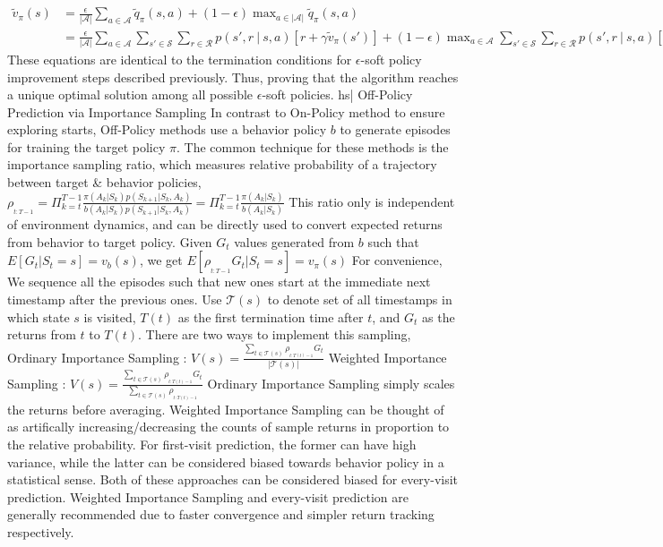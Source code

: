 \( \begin{aligned} \tilde{v}_\pi(s) &= \frac{\epsilon}{|\mathcal{A}|} \sum_{a \in \mathcal{A}} \tilde{q}_\pi(s, a) + (1 - \epsilon) \max_{a \in |\mathcal{A}|} \tilde{q}_\pi(s, a) \\ &= \frac{\epsilon}{|\mathcal{A}|} \sum_{a \in \mathcal{A}} \sum_{ s' \in \mathcal{S}} \sum_{r \in {\mathcal{R}}} p(s', r \ | \ s, a) [r + \gamma \tilde{v}_\pi(s')] + (1 - \epsilon) \max_{a \in \mathcal{A}} \sum_{s' \in \mathcal{S}} \sum_{r \in \mathcal{R}} p(s', r \ | \ s, a) [r + \gamma\tilde{v}_\pi(s')] \end{aligned} \)
These equations are identical to the termination conditions for \( \epsilon \)-soft policy improvement steps described previously. Thus, proving that the algorithm reaches a unique optimal solution among all possible \( \epsilon \)-soft policies.
hs| Off-Policy Prediction via Importance Sampling
In contrast to On-Policy method to ensure exploring starts, Off-Policy methods use a behavior policy \( b \) to generate episodes for training the target policy \( \pi \). The common technique for these methods is the importance sampling ratio, which measures relative probability of a trajectory between target & behavior policies,
\( \rho_{_{t:T-1}} = \Pi_{k=t}^{T-1}\frac{\pi(A_k | S_k) p(S_{k+1} | S_k, A_k)}{b(A_k | S_k) p(S_{k+1} | S_k, A_k)} = \Pi_{k=t}^{T-1} \frac{\pi(A_k | S_k)}{b(A_k | S_k)} \)
This ratio only is independent of environment dynamics, and can be directly used to convert expected returns from behavior to target policy.
Given \( G_t  \) values generated from \( b \) such that \( E[G_t| S_t=s] = v_b(s) \), we get \( E[\rho_{_{t:T-1}} G_t | S_t = s] = v_\pi(s) \)
For convenience, We sequence all the episodes such that new ones start at the immediate next timestamp after the previous ones. Use \( \mathcal{T}(s) \) to denote set of all timestamps in which state \( s \) is visited, \( T(t) \) as the first termination time after \( t \), and \( G_t \) as the returns from \( t \) to \( T(t) \). There are two ways to implement this sampling,
Ordinary Importance Sampling : \( V(s) = \frac{\sum_{t \in \mathcal{T}(s)} \rho_{_{t:T(t) - 1}} G_t}{| \mathcal{T}(s) |} \)
Weighted Importance Sampling : \( V(s) = \frac{\sum_{t \in \mathcal{T}(s)} \rho_{_{t:T(t) - 1}} G_t}{ \sum_{t \in \mathcal{T}(s)} \rho_{_{t:T(t) - 1}} } \)
Ordinary Importance Sampling simply scales the returns before averaging. Weighted Importance Sampling can be thought of as artifically increasing/decreasing the counts of sample returns in proportion to the relative probability. For first-visit prediction, the former can have high variance, while the latter can be considered biased towards behavior policy in a statistical sense. Both of these approaches can be considered biased for every-visit prediction. Weighted Importance Sampling and every-visit prediction are generally recommended due to faster convergence and simpler return tracking respectively.
